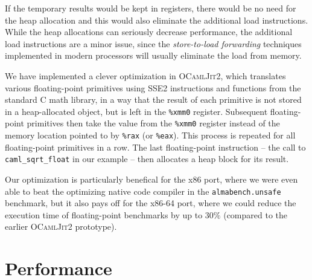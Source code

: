 \documentclass[12pt,a4paper,final]{article}
\begin{document}
If the temporary results would be kept in registers, there would be no need for
the heap allocation and this would also eliminate the additional load instructions.
While the heap allocations can seriously decrease performance, the additional
load instructions are a minor issue, since the \emph{store-to-load forwarding}
techniques \cite{Austin95,Lipasti96} implemented in modern processors will usually
eliminate the load from memory.

We have implemented a clever optimization in \textsc{OCamlJit2}, which translates
various floating-point primitives using SSE2 instructions and functions from the
standard C math library, in a way that the result of each primitive is not stored in
a heap-allocated object, but is left in the \texttt{\%xmm0} register. Subsequent
floating-point primitives then take the value from the \texttt{\%xmm0} register
instead of the memory location pointed to by \texttt{\%rax} (or \texttt{\%eax}).
This process is repeated for all floating-point primitives in a row. The last
floating-point instruction -- the call to \texttt{caml\_sqrt\_float} in our
example -- then allocates a heap block for its result.

Our optimization is particularly benefical for the x86 port, where we were even able
to beat the optimizing native code compiler in the \texttt{almabench.unsafe}
benchmark, but it also pays off for the x86-64 port, where we could reduce the
execution time of floating-point benchmarks by up to $30\%$ (compared to the
earlier \textsc{OCamlJit2} prototype).


\section{Performance} \label{section:Performance}
\end{document}
